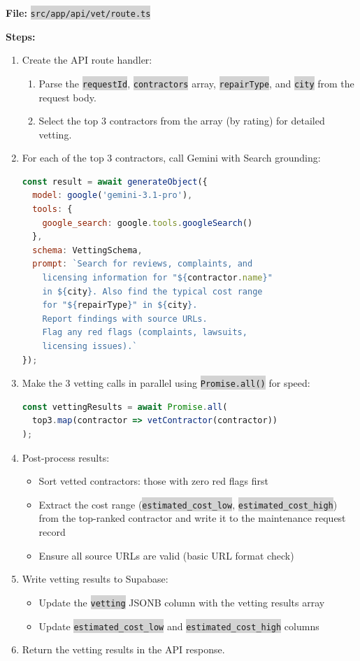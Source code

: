 \documentclass[11pt, a4paper]{article}
\newcommand{\code}[1]{\texttt{\small\colorbox{lightgray}{#1}}}
\begin{document}
\vspace{0.3em}

\textbf{File:} \code{src/app/api/vet/route.ts}

\textbf{Steps:}
\begin{enumerate}[leftmargin=2em, itemsep=2pt]
  \item Create the API route handler:
    \begin{enumerate}[itemsep=1pt]
      \item Parse the \code{requestId}, \code{contractors} array, \code{repairType}, and \code{city} from the request body.
      \item Select the top 3 contractors from the array (by rating) for detailed vetting.
    \end{enumerate}

  \item For each of the top 3 contractors, call Gemini with Search grounding:
\begin{lstlisting}[language=JavaScript]
const result = await generateObject({
  model: google('gemini-3.1-pro'),
  tools: { 
    google_search: google.tools.googleSearch() 
  },
  schema: VettingSchema,
  prompt: `Search for reviews, complaints, and 
    licensing information for "${contractor.name}" 
    in ${city}. Also find the typical cost range 
    for "${repairType}" in ${city}. 
    Report findings with source URLs.
    Flag any red flags (complaints, lawsuits, 
    licensing issues).`
});
\end{lstlisting}

  \item Make the 3 vetting calls in parallel using \code{Promise.all()} for speed:
\begin{lstlisting}[language=JavaScript]
const vettingResults = await Promise.all(
  top3.map(contractor => vetContractor(contractor))
);
\end{lstlisting}

  \item Post-process results:
    \begin{itemize}[itemsep=1pt]
      \item Sort vetted contractors: those with zero red flags first
      \item Extract the cost range (\code{estimated\_cost\_low}, \code{estimated\_cost\_high}) from the top-ranked contractor and write it to the maintenance request record
      \item Ensure all source URLs are valid (basic URL format check)
    \end{itemize}

  \item Write vetting results to Supabase:
    \begin{itemize}[itemsep=1pt]
      \item Update the \code{vetting} JSONB column with the vetting results array
      \item Update \code{estimated\_cost\_low} and \code{estimated\_cost\_high} columns
    \end{itemize}

  \item Return the vetting results in the API response.
\end{enumerate}
\end{document}
